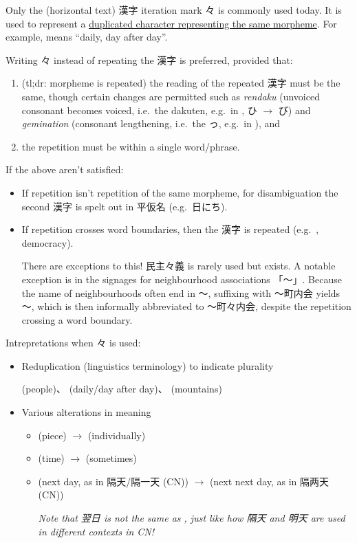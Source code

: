 \documentclass[../nihongo-gakushuu-kyouzai.tex]{subfiles}
\begin{document}
Only the (horizontal text) 漢字 iteration mark 々 is commonly used today. It is used to represent a \ul{duplicated character representing the same morpheme}. For example,  means ``daily, day after day''.

Writing 々 instead of repeating the 漢字 is preferred, provided that:
\begin{enumerate}[label=\arabic*.]
    \item (tl;dr: morpheme is repeated) the reading of the repeated 漢字 must be the same, though certain changes are permitted such as \emph{rendaku} (unvoiced consonant becomes voiced, i.e.\ the dakuten, e.g.\ in , ひ $\to$ び) and \emph{gemination} (consonant lengthening, i.e.\ the っ, e.g.\ in ), and
    \item the repetition must be within a single word/phrase.
\end{enumerate}
If the above aren't satisfied:
\begin{itemize}
    \item If repetition isn't repetition of the same morpheme, for disambiguation the second 漢字 is spelt out in 平仮名 (e.g.\ 日にち).
    \item If repetition crosses word boundaries, then the 漢字 is repeated (e.g.\ , democracy).

    There are exceptions to this! 民主々義 is rarely used but exists. A notable exception is in the signages for neighbourhood associations 「〜」. Because the name of neighbourhoods often end in 〜, suffixing with 〜町内会 yields 〜, which is then informally abbreviated to 〜町々内会, despite the repetition crossing a word boundary.

\end{itemize}

Intrepretations when 々 is used:
\begin{itemize}
    \item Reduplication (linguistics terminology) to indicate plurality

     (people)、 (daily/day after day)、 (mountains)
    \item Various alterations in meaning
    \begin{itemize}
        \item {} (piece) $\to$  (individually)
        \item {} (time) $\to$  (sometimes)
        \item {} (next day, as in 隔天/隔一天 (CN)) $\to$  (next next day, as in 隔两天 (CN))

        \emph{Note that 翌日 is not the same as , just like how 隔天 and 明天 are used in different contexts in CN!}
    \end{itemize}
\end{itemize}
\end{document}
